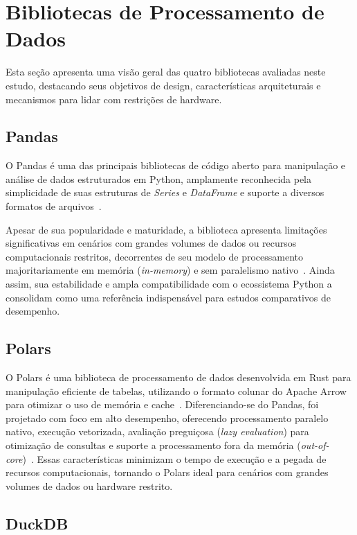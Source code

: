 \documentclass[12pt]{article}
\begin{document}
\section{Bibliotecas de Processamento de Dados}

Esta seção apresenta uma visão geral das quatro bibliotecas avaliadas neste estudo, destacando seus
objetivos de design, características arquiteturais e mecanismos para lidar com restrições de
hardware.

\subsection{Pandas}

O Pandas é uma das principais bibliotecas de código aberto para manipulação e análise de dados
estruturados em Python, amplamente reconhecida pela simplicidade de suas estruturas de
\textit{Series} e \textit{DataFrame} e suporte a diversos formatos de arquivos~\cite{mckinney:2012,
pandas:docs}.

Apesar de sua popularidade e maturidade, a biblioteca apresenta limitações significativas em
cenários com grandes volumes de dados ou recursos computacionais restritos, decorrentes de seu
modelo de processamento majoritariamente em memória (\textit{in-memory}) e sem paralelismo
nativo~\cite{pandas:docs}. Ainda assim, sua estabilidade e ampla compatibilidade com o ecossistema
Python a consolidam como uma referência indispensável para estudos comparativos de desempenho.


\subsection{Polars}

O Polars é uma biblioteca de processamento de dados desenvolvida em Rust para manipulação eficiente
de tabelas, utilizando o formato colunar do Apache Arrow para otimizar o uso de memória e
cache~\cite{polars:2026}. Diferenciando-se do Pandas, foi projetado com foco em alto desempenho,
oferecendo processamento paralelo nativo, execução vetorizada, avaliação preguiçosa (\textit{lazy
evaluation}) para otimização de consultas e suporte a processamento fora da memória (\textit{out-of-
core})~\cite{nvidia:2026, polars:2026}. Essas características minimizam o tempo de execução e a
pegada de recursos computacionais, tornando o Polars ideal para cenários com grandes volumes de
dados ou hardware restrito.


\subsection{DuckDB}
\end{document}
